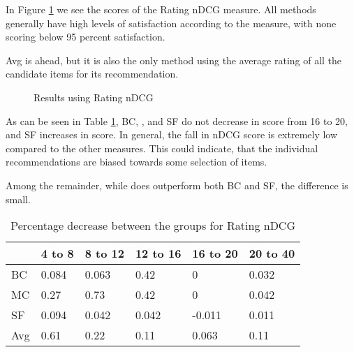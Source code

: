 In Figure \ref{fig:andcg} we see the scores of the Rating nDCG measure. All methods generally have high levels of satisfaction according to the measure, with none scoring below 95 percent satisfaction.

Avg is ahead, but it is also the only method using the average rating of all the candidate items for its recommendation.
\begin{figure}[H]
	\caption{Results using Rating nDCG}\label{fig:andcg}
\end{figure}

As can be seen in Table \ref{tbl:andcg}, BC, \MC, and SF do not decrease in score from 16 to 20, and SF increases in score. In general, the fall in nDCG score is extremely low compared to the other measures. This could indicate, that the individual recommendations are biased towards some selection of items.

Among the remainder, while \MC does outperform both BC and SF, the difference is small.

\begin{table}[H]
	\centering
	\begin{tabular}{|l|lllll|}\hline
		& 4 to 8 & 8 to 12 & 12 to 16 & 16 to 20 & 20 to 40 \\\hline
		BC 	& 0.084	& 0.063	& 0.42	& 0		& 0.032 \\
		MC  & 0.27	& 0.73	& 0.42	& 0		& 0.042 \\
		SF  & 0.094	& 0.042	& 0.042	&-0.011	& 0.011 \\
		Avg	& 0.61	& 0.22 	& 0.11	& 0.063	& 0.11  \\ \hline
	\end{tabular}
	\caption{Percentage decrease between the groups for Rating nDCG}
	\label{tbl:andcg}
\end{table}

